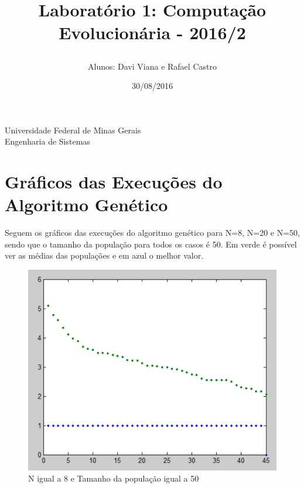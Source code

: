 \documentclass[12pt, a4paper]{article}
\title{
	\begin{large}
		Laboratório 1: Computação Evolucionária - 2016/2
	\end{large}}
\author{Alunos: Davi Viana e Rafael Castro}
\date{30/08/2016}
\begin{document}
	\maketitle
	
	\vspace*{-7.5cm}
	{\bf
		\begin{center}
			{\large
				\hspace*{0cm}Universidade Federal de Minas Gerais} \\
			\hspace*{0cm}Engenharia de Sistemas  \\
		\end{center}
	}
	\vspace*{5cm}
	
\section{Gráficos das Execuções do Algoritmo Genético}
\par Seguem os gráficos das execuções do algoritmo genético para N=8, N=20 e N=50, sendo que o tamanho da população para todos os casos é 50. Em verde é possível ver as médias das populações e em azul o melhor valor.
\begin{figure}[h]
	\centering
	\includegraphics[width=15cm]{img/n8.png}
	\caption{N igual a 8 e Tamanho da população igual a 50}
	\label{fig:n8}
\end{figure}  
\end{document}
